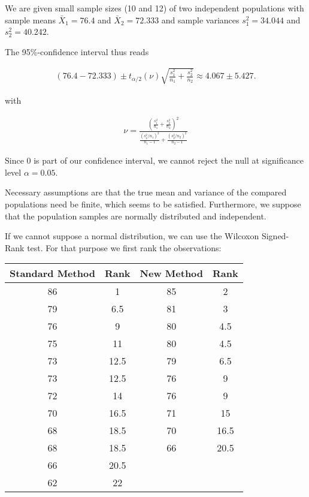 \begin{solution}

We are given small sample sizes (10 and 12) of two independent populations
with sample means $\bar{X}_1 = 76.4$ and $\bar{X}_2 = 72.333$ and sample
variances $s_1^2 = 34.044$ and $s_2^2 = 40.242$.

The 95\%-confidence interval thus reads

\begin{align*}
    (76.4 - 72.333) \pm t_{\alpha/2}(\nu)\sqrt{\frac{s_1^2}{n_1} + \frac{s_2^2}{n_2}}
    \approx 4.067 \pm 5.427.
\end{align*}

with 

\begin{align*}
    \nu = \frac{\left(\frac{s_1^2}{n_1} +  \frac{s_2^2}{n_2}\right)^2}
            {\frac{(s_1^2/n_1)^2}{n_1 - 1} + \frac{(s_2^2/n_2)^2}{n_2 - 1}}
\end{align*}

Since $0$ is part of our confidence interval, we cannot reject the null
at significance level $\alpha = 0.05$.

Necessary assumptions are that the true mean and variance of the compared
populations need be finite, which seems to be satisfied.
Furthermore, we suppose that the population samples are normally distributed and independent.

If we cannot suppose a normal distribution, we can use the Wilcoxon Signed-Rank test.
For that purpose we first rank the observations:
\vspace{10pt}

\begin{center}
    
    \begin{tabular}{c|c||c|c}
        Standard Method & Rank & New Method & Rank \\
        \hline
        86 & 1 & 85 & 2 \\
        79 & 6.5 & 81 & 3 \\
        76 & 9 & 80 & 4.5 \\
        75 & 11 & 80 & 4.5 \\
        73 & 12.5 & 79 & 6.5 \\
        73 & 12.5 & 76 & 9 \\
        72 & 14 & 76 & 9 \\
        70 & 16.5 & 71 & 15 \\
        68 & 18.5 & 70 & 16.5 \\
        68 & 18.5 & 66 & 20.5 \\
        66 & 20.5 & & \\
        62 & 22 & &
    \end{tabular}


\end{center}
\end{solution}
